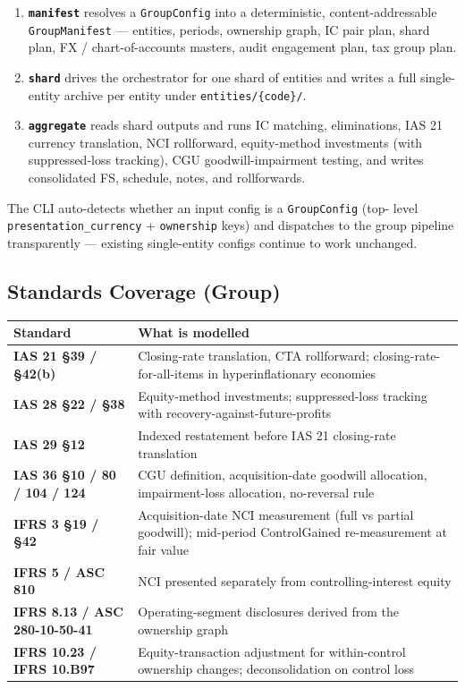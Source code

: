 \documentclass[11pt,a4paper]{article}
\begin{document}
\begin{enumerate}[leftmargin=1.4em, itemsep=4pt]
  \item \textbf{\texttt{manifest}} resolves a \texttt{GroupConfig} into a
        deterministic, content-addressable \texttt{GroupManifest} ---
        entities, periods, ownership graph, IC pair plan, shard plan,
        FX / chart-of-accounts masters, audit engagement plan, tax group plan.
  \item \textbf{\texttt{shard}} drives the orchestrator for one shard of
        entities and writes a full single-entity archive per entity under
        \texttt{entities/\{code\}/}.
  \item \textbf{\texttt{aggregate}} reads shard outputs and runs IC matching,
        eliminations, IAS 21 currency translation, NCI rollforward,
        equity-method investments (with suppressed-loss tracking), CGU
        goodwill-impairment testing, and writes consolidated FS, schedule,
        notes, and rollforwards.
\end{enumerate}

The CLI auto-detects whether an input config is a \texttt{GroupConfig} (top-
level \texttt{presentation\_currency} + \texttt{ownership} keys) and dispatches
to the group pipeline transparently --- existing single-entity configs continue
to work unchanged.

\subsection{Standards Coverage (Group)}

\renewcommand{\arraystretch}{1.2}
\begin{tabularx}{\textwidth}{@{}>{\bfseries\color{brand}}l X@{}}
\toprule
\textbf{Standard} & \textbf{What is modelled} \\
\midrule
IAS 21 \S{}39 / \S{}42(b) & Closing-rate translation, CTA rollforward; closing-rate-for-all-items in hyperinflationary economies \\
IAS 28 \S{}22 / \S{}38    & Equity-method investments; suppressed-loss tracking with recovery-against-future-profits \\
IAS 29 \S{}12             & Indexed restatement before IAS 21 closing-rate translation \\
IAS 36 \S{}10 / 80 / 104 / 124 & CGU definition, acquisition-date goodwill allocation, impairment-loss allocation, no-reversal rule \\
IFRS 3 \S{}19 / \S{}42    & Acquisition-date NCI measurement (full vs partial goodwill); mid-period ControlGained re-measurement at fair value \\
IFRS 5 / ASC 810          & NCI presented separately from controlling-interest equity \\
IFRS 8.13 / ASC 280-10-50-41 & Operating-segment disclosures derived from the ownership graph \\
IFRS 10.23 / IFRS 10.B97  & Equity-transaction adjustment for within-control ownership changes; deconsolidation on control loss \\
\bottomrule
\end{tabularx}
\end{document}
